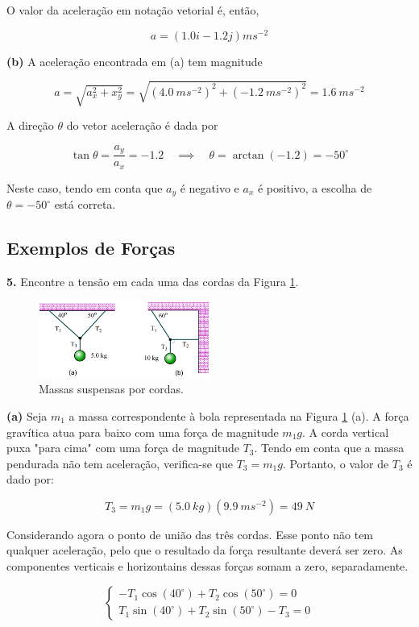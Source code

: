 O valor da aceleração em notação vetorial é, então,

$$
a=(1.0i-1.2j)ms^{-2}
$$

\textbf{(b)} A aceleração encontrada em (a) tem magnitude

$$
a=\sqrt{a_x^2+x_y^2}=\sqrt{(4.0\ ms^{-2})^2+(-1.2\ ms^{-2})^2}=1.6\ ms^{-2}
$$

A direção $\theta$ do vetor aceleração é dada por

$$
\tan \theta = \frac{a_y}{a_x} = -1.2 \quad \implies \quad \theta = \arctan(-1.2)=-50^{\circ}
$$

Neste caso, tendo em conta que $a_y$ é negativo e $a_x$ é positivo, a escolha de $\theta = -50^{\circ}$ está correta.

\subsection{Exemplos de Forças}
\textbf{5.} Encontre a tensão em cada uma das cordas da Figura \ref{fig:5caixa}.
\linebreak
\begin{figure}[h!]
    \centering
    \includegraphics[width=0.5\textwidth]{forças/fig/ex5.png}
    \caption{Massas suspensas por cordas.}
    \label{fig:5caixa}
\end{figure}

\textbf{(a)} Seja $m_1$ a massa correspondente à bola representada na Figura \ref{fig:5caixa} (a). A força gravítica atua para baixo com uma força de magnitude $m_1g$. A corda vertical puxa "para cima" com uma força de magnitude $T_3$. Tendo em conta que a massa pendurada não tem aceleração, verifica-se que $T_3=m_1g$. Portanto, o valor de $T_3$ é dado por:

$$
T_3=m_1g=(5.0\ kg)(9.9\ ms^{-2})=49\ N
$$

Considerando agora o ponto de união das três cordas. Esse ponto não tem qualquer aceleração, pelo que o resultado da força resultante deverá ser zero. As componentes verticais e horizontains dessas forças somam a zero, separadamente.

$$
    \begin{cases}
        -T_1\cos(40^{\circ})+T_2\cos(50^{\circ})=0 \\
        T_1\sin(40^{\circ})+T_2\sin(50^{\circ})-T_3=0
    \end{cases}
$$

